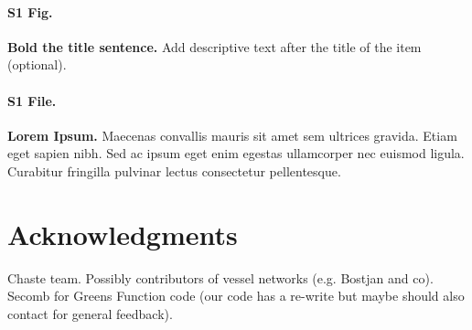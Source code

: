 \documentclass[10pt,letterpaper]{article}
\begin{document}
\paragraph*{S1 Fig.}
\label{S1_Fig}
{\bf Bold the title sentence.} Add descriptive text after the title of the item (optional).

\paragraph*{S1 File.}
\label{S1_File}
{\bf Lorem Ipsum.}  Maecenas convallis mauris sit amet sem ultrices gravida. Etiam eget sapien nibh. Sed ac ipsum eget enim egestas ullamcorper nec euismod ligula. Curabitur fringilla pulvinar lectus consectetur pellentesque.

\section*{Acknowledgments}
Chaste team. Possibly contributors of vessel networks (e.g. Bostjan and co). Secomb for Greens Function code (our code has a re-write but maybe should also contact for general feedback).

\nolinenumbers
\end{document}
